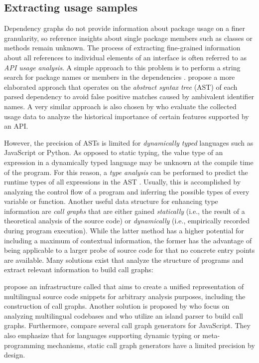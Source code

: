 \subsection{Extracting usage samples}
\label{sec:related_work/usage_samples}

Dependency graphs do not provide information about package usage on a finer granularity, so reference insights about single package members such as classes or methods remain unknown.
The process of extracting fine-grained information about all references to individual elements of an interface is often referred to as \emph{API usage analysis}.
A simple approach to this problem is to perform a string search for package names or members in the dependencies \citep{mileva2010mining}.
\citet{qiu2016understanding} propose a more elaborated approach that operates on the \emph{abstract syntax tree} (AST) of each parsed dependency to avoid false positive matches caused by ambivalent identifier names.
A very similar approach is also chosen by \citet{sawant2017fine} who evaluate the collected usage data to analyze the historical importance of certain features supported by an API.

However, the precision of ASTs is limited for \emph{dynamically typed} languages such as JavaScript or Python.
As opposed to static typing, the value type of an expression in a dynamically typed language may be unknown at the compile time of the program.
For this reason, a \emph{type analysis} can be performed to predict the runtime types of all expressions in the AST \citep{jensen2009type}.
Usually, this is accomplished by analyzing the control flow of a program and inferring the possible types of every variable or function.
Another useful data structure for enhancing type information are \emph{call graphs} that are either gained \emph{statically} (i.e., the result of a theoretical analysis of the source code) or \emph{dynamically} (i.e., empirically recorded during program execution).
While the latter method has a higher potential for including a maximum of contextual information, the former has the advantage of being applicable to a larger probe of source code for that no concrete entry points are available.
Many solutions exist that analyze the structure of programs and extract relevant information to build call graphs:

\citet{collard2013srcml} propose an infrastructure called  that aims to create a unified representation of multilingual source code snippets for arbitrary analysis purposes, including the construction of call graphs.
Another solution is proposed by \citet{bogar2018lightweight} who focus on analyzing multilingual codebases and who utilize an island parser to build call graphs.
Furthermore, \citet{antal2018static} compare several call graph generators for JavaScript.
They also emphasize that for languages supporting dynamic typing or meta-programming mechanisms, static call graph generators have a limited precision by design.

